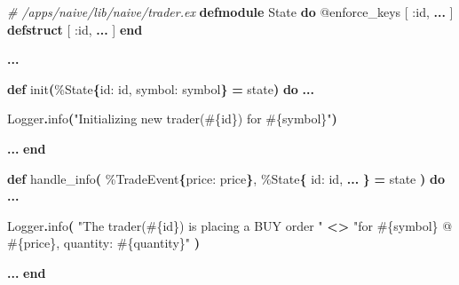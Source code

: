 \documentclass[
  oneside]{book}
\newenvironment{Shaded}{\begin{snugshade}}{\end{snugshade}}
\newcommand{\CommentTok}[1]{\textcolor[rgb]{0.56,0.35,0.01}{\textit{#1}}}
\newcommand{\ConstantTok}[1]{\textcolor[rgb]{0.56,0.35,0.01}{#1}}
\newcommand{\FunctionTok}[1]{\textcolor[rgb]{0.13,0.29,0.53}{\textbf{#1}}}
\newcommand{\KeywordTok}[1]{\textcolor[rgb]{0.13,0.29,0.53}{\textbf{#1}}}
\newcommand{\NormalTok}[1]{#1}
\newcommand{\OperatorTok}[1]{\textcolor[rgb]{0.81,0.36,0.00}{\textbf{#1}}}
\newcommand{\OtherTok}[1]{\textcolor[rgb]{0.56,0.35,0.01}{#1}}
\newcommand{\StringTok}[1]{\textcolor[rgb]{0.31,0.60,0.02}{#1}}
\newcommand{\VariableTok}[1]{\textcolor[rgb]{0.00,0.00,0.00}{#1}}
\begin{document}
\begin{Shaded}
\begin{Highlighting}[]
  \CommentTok{\# /apps/naive/lib/naive/trader.ex}
  \KeywordTok{defmodule} \ConstantTok{State} \KeywordTok{do}
    \OtherTok{@enforce\_keys} \OtherTok{[}
      \VariableTok{:id}\NormalTok{,}
      \OperatorTok{...}
    \OtherTok{]}
    \KeywordTok{defstruct} \OtherTok{[}
      \VariableTok{:id}\NormalTok{,}
      \OperatorTok{...}
    \OtherTok{]}
  \KeywordTok{end}

  \OperatorTok{...}

  \KeywordTok{def}\NormalTok{ init}\FunctionTok{(}\NormalTok{\%}\ConstantTok{State}\FunctionTok{\{}\VariableTok{id:}\NormalTok{ id, }\VariableTok{symbol:}\NormalTok{ symbol}\FunctionTok{\}} \OperatorTok{=}\NormalTok{ state}\FunctionTok{)} \KeywordTok{do}
    \OperatorTok{...}

    \ConstantTok{Logger}\OperatorTok{.}\NormalTok{info}\FunctionTok{(}\StringTok{"Initializing new trader(}\OtherTok{\#\{}\NormalTok{id}\OtherTok{\}}\StringTok{) for }\OtherTok{\#\{}\NormalTok{symbol}\OtherTok{\}}\StringTok{"}\FunctionTok{)}

    \OperatorTok{...}
  \KeywordTok{end}

  \KeywordTok{def}\NormalTok{ handle\_info}\FunctionTok{(}
\NormalTok{        \%}\ConstantTok{TradeEvent}\FunctionTok{\{}\VariableTok{price:}\NormalTok{ price}\FunctionTok{\}}\NormalTok{,}
\NormalTok{        \%}\ConstantTok{State}\FunctionTok{\{}
          \VariableTok{id:}\NormalTok{ id,}
          \OperatorTok{...}
        \FunctionTok{\}} \OperatorTok{=}\NormalTok{ state}
      \FunctionTok{)} \KeywordTok{do}
    \OperatorTok{...}

    \ConstantTok{Logger}\OperatorTok{.}\NormalTok{info}\FunctionTok{(}
      \StringTok{"The trader(}\OtherTok{\#\{}\NormalTok{id}\OtherTok{\}}\StringTok{) is placing a BUY order "} \OperatorTok{\textless{}\textgreater{}}
        \StringTok{"for }\OtherTok{\#\{}\NormalTok{symbol}\OtherTok{\}}\StringTok{ @ }\OtherTok{\#\{}\NormalTok{price}\OtherTok{\}}\StringTok{, quantity: }\OtherTok{\#\{}\NormalTok{quantity}\OtherTok{\}}\StringTok{"}
    \FunctionTok{)}

    \OperatorTok{...}
  \KeywordTok{end}


\end{Highlighting}
\end{Shaded}
\end{document}
